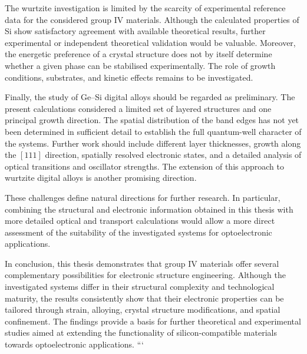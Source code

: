 The wurtzite investigation is limited by the scarcity of experimental reference data for the considered group IV materials. Although the calculated properties of Si show satisfactory agreement with available theoretical results, further experimental or independent theoretical validation would be valuable. Moreover, the energetic preference of a crystal structure does not by itself determine whether a given phase can be stabilised experimentally. The role of growth conditions, substrates, and kinetic effects remains to be investigated.

Finally, the study of Ge--Si digital alloys should be regarded as preliminary. The present calculations considered a limited set of layered structures and one principal growth direction. The spatial distribution of the band edges has not yet been determined in sufficient detail to establish the full quantum-well character of the systems. Further work should include different layer thicknesses, growth along the $[111]$ direction, spatially resolved electronic states, and a detailed analysis of optical transitions and oscillator strengths. The extension of this approach to wurtzite digital alloys is another promising direction.

These challenges define natural directions for further research. In particular, combining the structural and electronic information obtained in this thesis with more detailed optical and transport calculations would allow a more direct assessment of the suitability of the investigated systems for optoelectronic applications.

\ornament

In conclusion, this thesis demonstrates that group IV materials offer several complementary possibilities for electronic structure engineering. Although the investigated systems differ in their structural complexity and technological maturity, the results consistently show that their electronic properties can be tailored through strain, alloying, crystal structure modifications, and spatial confinement. The findings provide a basis for further theoretical and experimental studies aimed at extending the functionality of silicon-compatible materials towards optoelectronic applications.
```